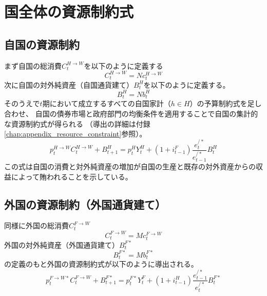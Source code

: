 
\section{国全体の資源制約式}
\label{sec:model_resource_constraints}

\subsection{自国の資源制約}
\label{sec:model_resource_constraints_home}
まず自国の総消費\(C_t^{H\to W}\)を以下のように定義する
\begin{equation}
\label{form:model_resource_constraints_home_C_H_W_def}
    C_t^{H\to W}=Nc_t^{H\to W}
\end{equation}
次に自国の対外純資産（自国通貨建て）\(B_t^H\)を以下のように定義する。
\begin{equation}
\label{form:model_resource_constraints_home_B_H_def}
    B_t^H=Nb_t^H
\end{equation}
そのうえで\(t\)期において成立するすべての自国家計（\(h\in H\)）の予算制約式を足し合わせ、
自国の債券市場と政府部門の均衡条件を適用することで自国の集計的な資源制約式が得られる
（導出の詳細は付録\ref{chap:appendix_resource_constraint}参照）。
\begin{equation}
\label{form:model_resource_constraints_home_eq}
    p_t^{H\to W}C_t^{H\to W}+B_{t+1}^H=p_t^HY_t^H+(1+i_{t-1}^F)\frac{e_t^{/*}}{e_{t-1}^{/*}}B_t^H
\end{equation}
この式は自国の消費と対外純資産の増加が自国の生産と既存の対外資産からの収益によって賄われることを示している。

\subsection{外国の資源制約（外国通貨建て）}
\label{sec:model_resource_constraints_foreign}
同様に外国の総消費\(C_t^{F\to W}\)
\begin{equation}
\label{form:model_resource_constraints_foreign_C_F_W_def}
    C_t^{F\to W}=Mc_t^{F\to W}
\end{equation}
外国の対外純資産（外国通貨建て）\(B_t^{F*}\)
\begin{equation}
\label{form:model_resource_constraints_foreign_B_F_star_def}
    B_t^{F*}=Mb_t^{F*}
\end{equation}
の定義のもと外国の資源制約式が以下のように導出される。
\begin{equation}
\label{form:model_resource_constraints_foreign_eq}
    p_t^{F\to W*}C_t^{F\to W}+B_{t+1}^{F*}=p_t^{F*}Y_t^F+(1+i_{t-1}^H)\frac{e_{t-1}^{/*}}{e_t^{/*}}B_t^{F*}
\end{equation}